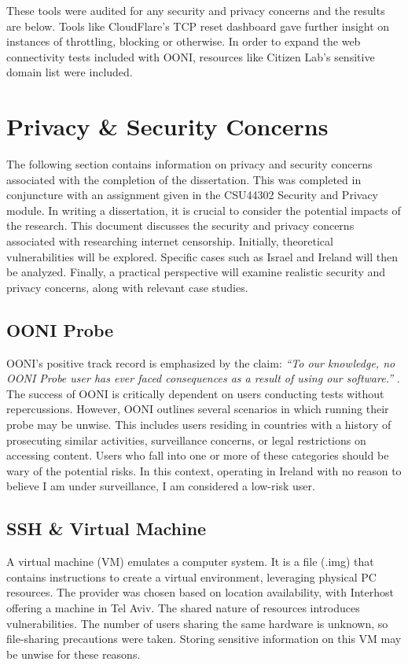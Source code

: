 These tools were audited for any security and privacy concerns and the results are below. Tools like CloudFlare's TCP reset dashboard \cite{cloudflare_policy_blog} gave further insight on instances of throttling, blocking or otherwise. In order to expand the web connectivity tests included with OONI, resources like Citizen Lab's sensitive domain list were included. \cite{citizenlab_testlists} 

\section{Privacy \& Security Concerns}
The following section contains information on privacy and security concerns associated with the completion of the dissertation. This was completed in conjuncture with an assignment given in the CSU44302 Security and Privacy module. 
In writing a dissertation, it is crucial to consider the potential impacts of the research. This document discusses the security and privacy concerns associated with researching internet censorship. Initially, theoretical vulnerabilities will be explored. Specific cases such as Israel and Ireland will then be analyzed. Finally, a practical perspective will examine realistic security and privacy concerns, along with relevant case studies.

\subsection{OONI Probe}
OONI's positive track record is emphasized by the claim: \textit{“To our knowledge, no OONI Probe user has ever faced consequences as a result of using our software.”} \cite{OONIRisks}. The success of OONI is critically dependent on users conducting tests without repercussions. However, OONI outlines several scenarios in which running their probe may be unwise. This includes users residing in countries with a history of prosecuting similar activities, surveillance concerns, or legal restrictions on accessing content. Users who fall into one or more of these categories should be wary of the potential risks. In this context, operating in Ireland with no reason to believe I am under surveillance, I am considered a low-risk user.

\subsection{SSH \& Virtual Machine}
A virtual machine (VM) emulates a computer system. It is a file (.img) that contains instructions to create a virtual environment, leveraging physical PC resources. The provider was chosen based on location availability, with Interhost offering a machine in Tel Aviv. The shared nature of resources introduces vulnerabilities. The number of users sharing the same hardware is unknown, so file-sharing precautions were taken. Storing sensitive information on this VM may be unwise for these reasons.

